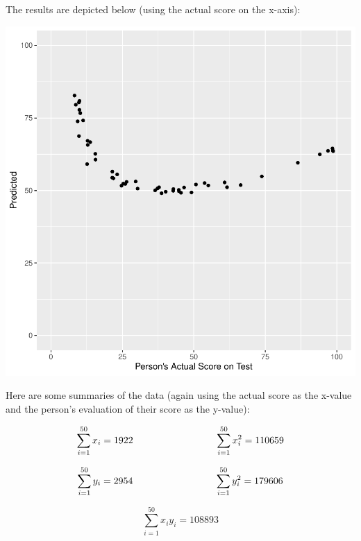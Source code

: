 \documentclass[addpoints]{examsetup}
\begin{document}
\begin{questions}
The results are depicted below (using the actual score on the x-axis):
\begin{center}
\includegraphics{stat305_q2-003}
\end{center}
\pagebreak
Here are some summaries of the data (again using the actual score as the x-value and the person's evaluation of their score as the y-value):

$$
   \sum_{i=1}^{50} x_i = 1922 \hspace{3cm} \sum_{i=1}^{50} x_i^2 = 110659 \\
$$

$$
   \sum_{i=1}^{50} y_i = 2954 \hspace{3cm} \sum_{i=1}^{50} y_i^2 = 179606 \\
$$

$$
   \sum_{i=1}^{50} x_i y_i = 108893
$$

\end{questions}
\end{document}
